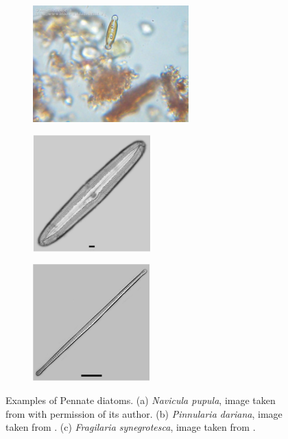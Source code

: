 \documentclass[letterpaper,12pt,oneside]{book}
\begin{document}
\begin{figure}[H]
     \centering
     \begin{subfigure}[b]{0.3\textwidth}
         \centering
         \includegraphics[width=\textwidth, height=4.5cm]{Pennate/Screen Shot 2023-06-18 at 10.14.52 PM.png}
         \caption{  }
         \label{fig:y equals x}
     \end{subfigure}
     \hfill
     \begin{subfigure}[b]{0.3\textwidth}
         \centering
         \includegraphics[width=\textwidth, height=4.5cm]{Pennate/Screen Shot 2023-06-18 at 10.25.11 PM.png}
         \caption{}
         \label{fig:three sin x}
     \end{subfigure}
     \hfill
     \begin{subfigure}[b]{0.3\textwidth}
         \centering
         \includegraphics[width=\textwidth, height=4.5cm]{Pennate/grotestcapennate.png}
         \caption{}
         \label{fig:five over x}
     \end{subfigure}
        \caption{Examples of Pennate diatoms. 
(a) \textit{Navicula pupula}, image taken from \cite{Pedreira_2012} with permission of its author. (b) \textit{Pinnularia dariana}, image taken from \cite{DiatomsofNorthAmericadariana}. (c) \textit{Fragilaria synegrotesca}, image taken from \cite{DiatomsofNorthAmericafragilaria}.}
        \label{pennate diatoms}
\end{figure} \noindent
\end{document}
